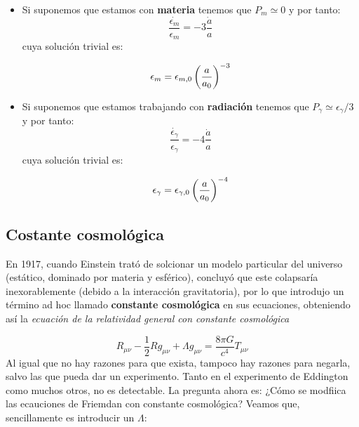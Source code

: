 \begin{itemize}
	\item Si suponemos que estamos con \textbf{materia} tenemos que $P_m\simeq 0$ y por tanto:
	      \begin{equation}
		      \frac{\dot{\epsilon_m}}{\epsilon_m} = -3\frac{\dot{a}}{a}
	      \end{equation}
	      cuya solución trivial es:

	      \begin{equation}
		      \epsilon_m = \epsilon_{m,0} \left( \frac{a}{a_0} \right)^{-3}
	      \end{equation}
	\item Si suponemos que estamos trabajando con \textbf{radiación} tenemos que $P_\gamma\simeq \epsilon_\gamma/3$ y por tanto:
	      \begin{equation}
		      \frac{\dot{\epsilon_\gamma}}{\epsilon_\gamma} = -4\frac{\dot{a}}{a}
	      \end{equation}
	      cuya solución trivial es:

	      \begin{equation}
		      \epsilon_\gamma = \epsilon_{\gamma,0} \left( \frac{a}{a_0} \right)^{-4}
	      \end{equation}
\end{itemize}

\subsection{Costante cosmológica}

En 1917, cuando Einstein trató de solcionar un modelo particular del universo (estático, dominado por materia y esférico), concluyó que este colapsaría inexorablemente (debido a la interacción gravitatoria), por lo que introdujo un término ad hoc llamado \textbf{constante cosmológica} en sus ecuaciones, obteniendo así la \textit{ecuación de la relatividad general con constante cosmológica}

\begin{equation}
	R_{\mu \nu} - \frac{1}{2} R g_{\mu \nu} + \Lambda g_{\mu \nu} = \frac{8 \pi G}{c^4} T_{\mu \nu}
\end{equation}
Al igual que no hay razones para que exista, tampoco hay razones para negarla, salvo las que pueda dar un experimento. Tanto en el experimento de Eddington como muchos otros, no es detectable. La pregunta ahora es: ¿Cómo se modfiica las ecauciones de Friemdan con constante cosmológica? Veamos que, sencillamente es introducir un $\Lambda$:

